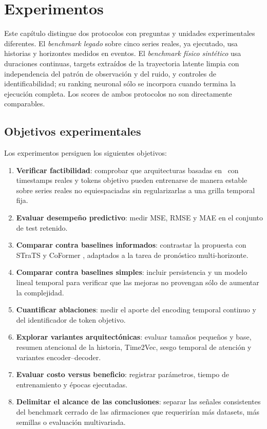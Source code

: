 \chapter{Experimentos}
\label{cap:experimentos}

Este capítulo distingue dos protocolos con preguntas y unidades experimentales diferentes. El \emph{benchmark legado} sobre cinco series reales, ya ejecutado, usa historias y horizontes medidos en eventos. El \emph{benchmark físico sintético} usa duraciones continuas, targets extraídos de la trayectoria latente limpia con independencia del patrón de observación y del ruido, y controles de identificabilidad; su ranking neuronal sólo se incorpora cuando termina la ejecución completa. Los scores de ambos protocolos no son directamente comparables.

\section{Objetivos experimentales}
\label{sec:objetivos-experimentales}

Los experimentos persiguen los siguientes objetivos:

\begin{enumerate}
	\item \textbf{Verificar factibilidad}: comprobar que arquitecturas basadas en \Transformers\ con timestamps reales y tokens objetivo pueden entrenarse de manera estable sobre series reales no equiespaciadas sin regularizarlas a una grilla temporal fija.
	\item \textbf{Evaluar desempeño predictivo}: medir MSE, RMSE y MAE en el conjunto de test retenido.
	\item \textbf{Comparar contra baselines informados}: contrastar la propuesta con STraTS \cite{tipirneni2022strats} y CoFormer \cite{wei2023coformer}, adaptados a la tarea de pronóstico multi-horizonte.
	\item \textbf{Comparar contra baselines simples}: incluir persistencia y un modelo lineal temporal para verificar que las mejoras no provengan sólo de aumentar la complejidad.
	\item \textbf{Cuantificar ablaciones}: medir el aporte del encoding temporal continuo y del identificador de token objetivo.
	\item \textbf{Explorar variantes arquitectónicas}: evaluar tamaños pequeños y base, resumen atencional de la historia, Time2Vec, sesgo temporal de atención y variantes encoder--decoder.
	\item \textbf{Evaluar costo versus beneficio}: registrar parámetros, tiempo de entrenamiento y épocas ejecutadas.
	\item \textbf{Delimitar el alcance de las conclusiones}: separar las señales consistentes del benchmark cerrado de las afirmaciones que requerirían más datasets, más semillas o evaluación multivariada.
\end{enumerate}

